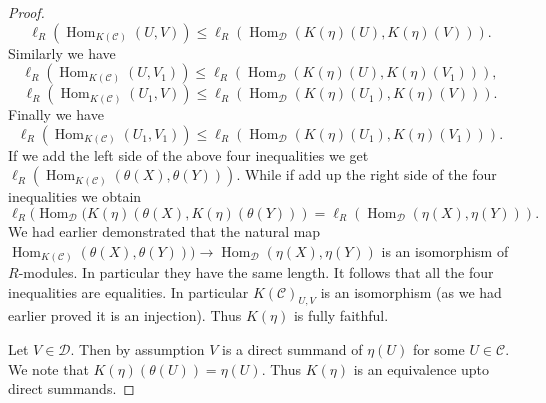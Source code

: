 \documentclass{amsart}
\newcommand{\D}{\mathcal{D} }
\newcommand{\C}{\mathcal{C}}
\newcommand{\rt}{\rightarrow}
\newcommand{\Hom}{\operatorname{Hom}}
\theoremstyle{plain}
\theoremstyle{definition}
\theoremstyle{remark}
\begin{document}
{\begin{proof}
\begin{equation*}
\ell_R(\Hom_{K(\C)}(U,V)) \leq
\ell_R (\Hom_\D(K(\eta)(U), K(\eta)(V))).  \tag{i}
\end{equation*}
Similarly we have
\begin{equation*}
\ell_R(\Hom_{K(\C)}(U,V_1)) \leq
\ell_R (\Hom_\D(K(\eta)(U), K(\eta)(V_1))),  \tag{ii}
\end{equation*}
\begin{equation*}
\ell_R(\Hom_{K(\C)}(U_1,V)) \leq
\ell_R (\Hom_\D(K(\eta)(U_1), K(\eta)(V))).  \tag{iii}
\end{equation*}
Finally we have
\begin{equation*}
\ell_R(\Hom_{K(\C)}(U_1,V_1)) \leq
\ell_R (\Hom_\D(K(\eta)(U_1), K(\eta)(V_1))).  \tag{iv}
\end{equation*}
If we add the left side of the above four inequalities we get \\ $\ell_R(\Hom_{K(\C)}(\theta(X), \theta(Y)))$. While if add up the right side of the four inequalities we obtain
$$\ell_R(\Hom_\D(K(\eta)(\theta(X), K(\eta)(\theta(Y))) = \ell_R(\Hom_\D(\eta(X), \eta(Y))).$$
We had earlier demonstrated that the natural map \\ $\Hom_{K(\C)}(\theta(X), \theta(Y))) \rt \Hom_\D(\eta(X), \eta(Y))$ is an isomorphism of $R$-modules. In particular they have the same length.
It follows that all the four inequalities are equalities. In particular $K(\C)_{U, V}$ is an isomorphism (as we had earlier proved it is an injection). Thus $K(\eta)$ is fully faithful.

Let $V \in \D$. Then by assumption $V$ is a direct summand of $\eta(U)$ for some $U \in \C$. We note that $K(\eta)(\theta (U)) = \eta(U)$. Thus $K(\eta)$ is an equivalence upto direct summands.
\end{proof}

}
\end{document}
